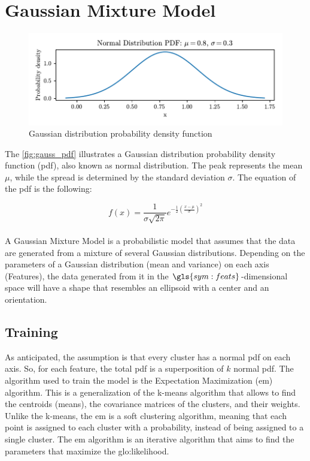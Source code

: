 \section{Gaussian Mixture Model}
\label{sec:gaussian}

\begin{figure}
    \centering
    \includegraphics{images/Gaussian/Figure_3.pdf}
    \caption{Gaussian distribution probability density function}
    \label{fig:gauss_pdf}
\end{figure}

The \autoref{fig:gauss_pdf} illustrates a Gaussian distribution probability density function (\gls{pdf}), also known as normal distribution. The peak represents the mean $\mu$, while the spread is determined by the standard deviation $\sigma$. The equation of the \gls{pdf} is the following:

$$
f(x) = \frac{1}{\sigma \sqrt{2\pi} } e^{-\frac{1}{2}\left(\frac{x-\mu}{\sigma}\right)^2}
$$

\paragraph*{}
A Gaussian Mixture Model is a probabilistic model that assumes that the data are generated from a mixture of several Gaussian distributions. Depending on the parameters of a Gaussian distribution (mean and variance) on each axis (Features), the data generated from it in the $\gls{sym:feats}$-dimensional space will have a shape that resembles an ellipsoid with a center and an orientation.


\subsection{Training}
\label{sec:gauss_train}
As anticipated, the assumption is that every cluster has a normal \gls{pdf} on each axis. So, for each feature, the total \gls{pdf} is a superposition of $k$ normal \gls{pdf}. 
The algorithm used to train the model is the Expectation Maximization (\gls{em}) algorithm. This is a generalization of the k-means algorithm that allows to find the centroids (means), the covariance matrices of the clusters, and their weights. Unlike the k-means, the \gls{em} is a soft clustering algorithm, meaning that each point is assigned to each cluster with a probability, instead of being assigned to a single cluster.
The \gls{em} algorithm is an iterative algorithm that aims to find the parameters that maximize the \gls{glo:likelihood}.

